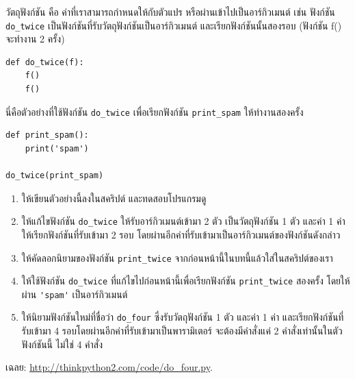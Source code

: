 \begin{exercise}

วัตถุฟังก์ชัน คือ ค่าที่เราสามารถกำหนดให้กับตัวแปร หรือผ่านเข้าไปเป็นอาร์กิวเมนต์
เช่น ฟังก์ชัน \verb"do_twice" เป็นฟังก์ชันที่รับวัตถุฟังก์ชันเป็นอาร์กิวเมนต์ และเรียกฟังก์ชันนั้นสองรอบ 
(ฟังก์ชัน f() จะทำงาน 2 ครั้ง)

\begin{verbatim}
def do_twice(f):
    f()
    f()
\end{verbatim}

นี่คือตัวอย่างที่ใช้ฟังก์ชัน \verb"do_twice" เพื่อเรียกฟังก์ชัน \verb|print_spam| ให้ทำงานสองครั้ง 

\begin{verbatim}
def print_spam():
    print('spam')

do_twice(print_spam)
\end{verbatim}

\begin{enumerate}

\item ให้เขียนตัวอย่างนี้ลงในสคริปต์ และทดสอบโปรแกรมดู

\item ให้แก้ไขฟังก์ชัน \verb"do_twice" ให้รับอาร์กิวเมนต์เข้ามา 2 ตัว เป็นวัตถุฟังก์ชัน 1 ตัว และค่า 1 ค่า
ให้เรียกฟังก์ชันที่รับเข้ามา 2 รอบ โดยผ่านอีกค่าที่รับเข้ามาเป็นอาร์กิวเมนต์ของฟังก์ชันดังกล่าว

\item ให้คัดลอกนิยามของฟังก์ชัน \verb|print_twice| จากก่อนหน้านี้ในบทนี้แล้วใส่ในสคริปต์ของเรา

\item ให้ใช้ฟังก์ชัน \verb"do_twice" ที่แก้ไขไปก่อนหน้านี้เพื่อเรียกฟังก์ชัน \verb|print_twice| สองครั้ง
โดยให้ผ่าน \verb"'spam'" เป็นอาร์กิวเมนต์

\item ให้นิยามฟังก์ชันใหม่ที่ชื่อว่า \verb"do_four" ซึ่งรับวัตถุฟังก์ชัน 1 ตัว และค่า 1 ค่า
และเรียกฟังก์ชันที่รับเข้ามา 4 รอบโดยผ่านอีกค่าที่รับเข้ามาเป็นพารามิเตอร์
จะต้องมีคำสั่งแค่ 2 คำสั่งเท่านั้นในตัวฟังก์ชันนี้ ไม่ใช่ 4 คำสั่ง

\end{enumerate}

เฉลย: \url{http://thinkpython2.com/code/do_four.py}.

\end{exercise}



